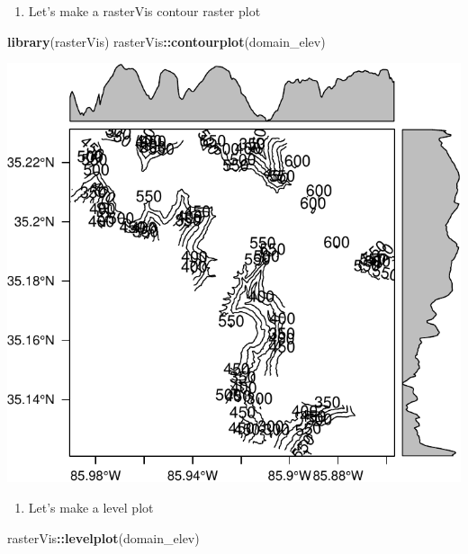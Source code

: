 \documentclass[
]{book}
\newenvironment{Shaded}{\begin{snugshade}}{\end{snugshade}}
\newcommand{\KeywordTok}[1]{\textcolor[rgb]{0.13,0.29,0.53}{\textbf{#1}}}
\newcommand{\NormalTok}[1]{#1}
\newcommand{\OperatorTok}[1]{\textcolor[rgb]{0.81,0.36,0.00}{\textbf{#1}}}
\providecommand{\tightlist}{%
  \setlength{\itemsep}{0pt}\setlength{\parskip}{0pt}}
\begin{document}
\begin{enumerate}
\def\labelenumi{\arabic{enumi}.}
\setcounter{enumi}{27}
\tightlist
\item
  Let's make a rasterVis contour raster plot
\end{enumerate}

\begin{Shaded}
\begin{Highlighting}[]
\KeywordTok{library}\NormalTok{(rasterVis)}
\NormalTok{rasterVis}\OperatorTok{::}\KeywordTok{contourplot}\NormalTok{(domain_elev)}
\end{Highlighting}
\end{Shaded}

\includegraphics{figures/unnamed-chunk-435-1.pdf}

\begin{enumerate}
\def\labelenumi{\arabic{enumi}.}
\setcounter{enumi}{28}
\tightlist
\item
  Let's make a level plot
\end{enumerate}

\begin{Shaded}
\begin{Highlighting}[]
\NormalTok{rasterVis}\OperatorTok{::}\KeywordTok{levelplot}\NormalTok{(domain_elev)}
\end{Highlighting}
\end{Shaded}
\end{document}
